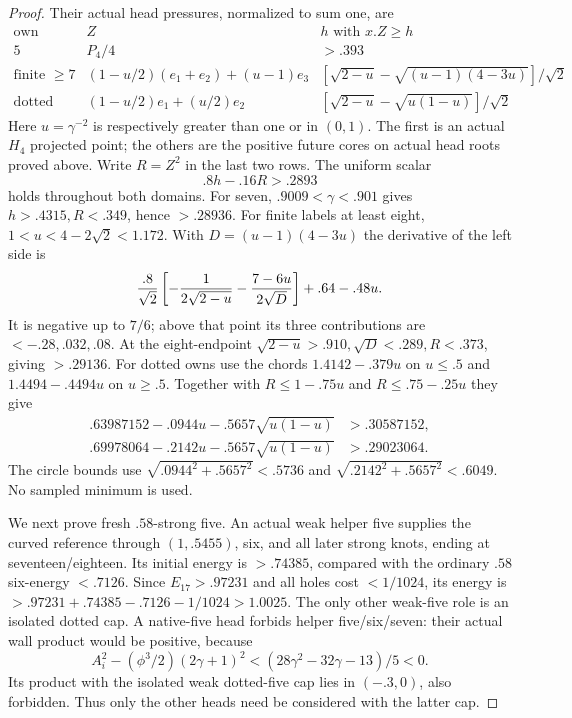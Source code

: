 \begin{proof}
Their actual head pressures, normalized to sum one, are
\[
\begin{array}{c|c|c}
\text{own}&Z&h\text{ with }x.Z\ge h\\\hline
5&P_4/4&>.393\\
\text{finite }\ge7&(1-u/2)(e_1+e_2)+(u-1)e_3&
[\sqrt{2-u}-\sqrt{(u-1)(4-3u)}]/\sqrt2\\
\text{dotted}&(1-u/2)e_1+(u/2)e_2&
[\sqrt{2-u}-\sqrt{u(1-u)}]/\sqrt2
\end{array}
\]
Here $u=\gamma^{-2}$ is respectively greater than one or in
$(0,1)$. The first is an actual $H_4$ projected point; the
others are the positive future cores on actual head roots proved
above. Write $R=Z^2$ in the last two rows. The uniform scalar
\begin{equation}\label{app:tail:eq:B20headscalar}
 .8h-.16R>.2893
\end{equation}
holds throughout both domains. For seven,
$.9009<\gamma<.901$ gives $h>.4315,R<.349$, hence $>.28936$.
For finite labels at least eight, $1<u<4-2\sqrt2<1.172$.
With $D=(u-1)(4-3u)$ the derivative of the left side is
\[
 { .8\over\sqrt2}
 \left[-{1\over2\sqrt{2-u}}-{7-6u\over2\sqrt D}\right]
                   +.64-.48u.
\]
It is negative up to $7/6$; above that point its three
contributions are $<-.28,.032,.08$. At the eight-endpoint
$\sqrt{2-u}>.910,\sqrt D<.289,R<.373$, giving $>.29136$.
For dotted owns use the chords $1.4142-.379u$ on $u\le.5$
and $1.4494-.4494u$ on $u\ge.5$.
Together with $R\le1-.75u$ and $R\le.75-.25u$ they give
\[
\begin{split}
.63987152-.0944u-.5657\sqrt{u(1-u)}&>.30587152,\\
.69978064-.2142u-.5657\sqrt{u(1-u)}&>.29023064.
\end{split}
\]
The circle bounds use
$\sqrt{.0944^2+.5657^2}<.5736$ and
$\sqrt{.2142^2+.5657^2}<.6049$. No sampled minimum is used.

We next prove fresh $.58$-strong five. An actual weak helper
five supplies the curved reference through $(1,.5455)$, six,
and all later strong knots, ending at seventeen/eighteen.
Its initial energy is $>.74385$, compared with the ordinary
$.58$ six-energy $<.7126$. Since $E_{17}>.97231$ and all
holes cost $<1/1024$, its energy is
$>.97231+.74385-.7126-1/1024>1.0025$.
The only other weak-five role is an isolated dotted cap.
A native-five head forbids helper five/six/seven: their actual
wall product would be positive, because
\[
 A_i^2-(\phi^3/2)(2\gamma+1)^2
       <(28\gamma^2-32\gamma-13)/5<0.
\]
Its product with the isolated weak dotted-five cap lies in
$(-.3,0)$, also forbidden. Thus only the other heads need be
considered with the latter cap.


\end{proof}

